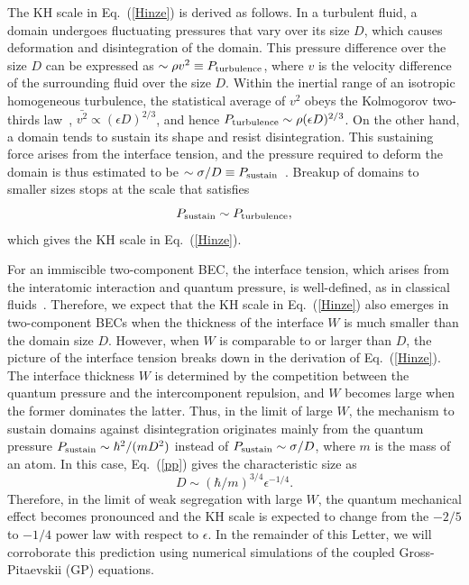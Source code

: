 \documentclass[pra,aps,superscriptaddress,twocolumn]{revtex4-2}
\begin{document}
The KH scale in Eq.~(\ref{Hinze}) is derived as follows.
In a turbulent fluid, a domain undergoes fluctuating pressures that vary
over its size $D$, which causes deformation and disintegration of the
domain.
This pressure difference over the size $D$ can be expressed as $\sim \rho
v^2 \equiv P_{\rm turbulence}$, where $v$ is the velocity difference of the
surrounding fluid over the size $D$.
Within the inertial range of an isotropic homogeneous turbulence,
the statistical average of $v^2$ obeys the Kolmogorov two-thirds
law~\cite{Frisch}, $\bar{v^2} \propto (\epsilon D)^{2/3}$, and hence
$P_{\rm turbulence} \sim \rho (\epsilon D)^{2/3}$.
On the other hand, a domain tends to sustain its shape and resist
disintegration.
This sustaining force arises from the interface tension, and the pressure
required to deform the domain is thus estimated to be $\sim \sigma / D
\equiv P_{\rm sustain}$~\cite{Landau}. 
Breakup of domains to smaller sizes stops at the scale that satisfies
\begin{equation} \label{pp}
  P_{\rm sustain} \sim P_{\rm turbulence},
\end{equation}  
which gives the KH scale in Eq.~(\ref{Hinze}).

For an immiscible two-component BEC, the interface tension, which arises
from the interatomic interaction and quantum pressure, is well-defined, as
in classical fluids~\cite{Ao, Barankov, Schae}.
Therefore, we expect that the KH scale in Eq.~(\ref{Hinze}) also emerges in
two-component BECs when the thickness of the interface $W$ is much smaller
than the domain size $D$.
However, when $W$ is comparable to or larger than $D$, the picture of the
interface tension breaks down in the derivation of Eq.~(\ref{Hinze}).
The interface thickness $W$ is determined by the competition between the
quantum pressure and the intercomponent repulsion, and $W$ becomes large
when the former dominates the latter.
Thus, in the limit of large $W$, the mechanism to sustain domains against
disintegration originates mainly from the quantum pressure $P_{\rm sustain}
\sim \hbar^2 / (m D^2)$ instead of $P_{\rm sustain} \sim \sigma / D$, where
$m$ is the mass of an atom.
In this case, Eq.~(\ref{pp}) gives the characteristic size as
\begin{equation} \label{qHinze}
D \sim (\hbar / m)^{3/4} \epsilon^{-1/4}.
\end{equation}
Therefore, in the limit of weak segregation with large $W$, the quantum
mechanical effect becomes pronounced and the KH scale is expected to change
from the $-2/5$ to $-1/4$ power law with respect to $\epsilon$.
In the remainder of this Letter, we will corroborate this prediction using
numerical simulations of the coupled Gross-Pitaevskii (GP) equations.
\end{document}
